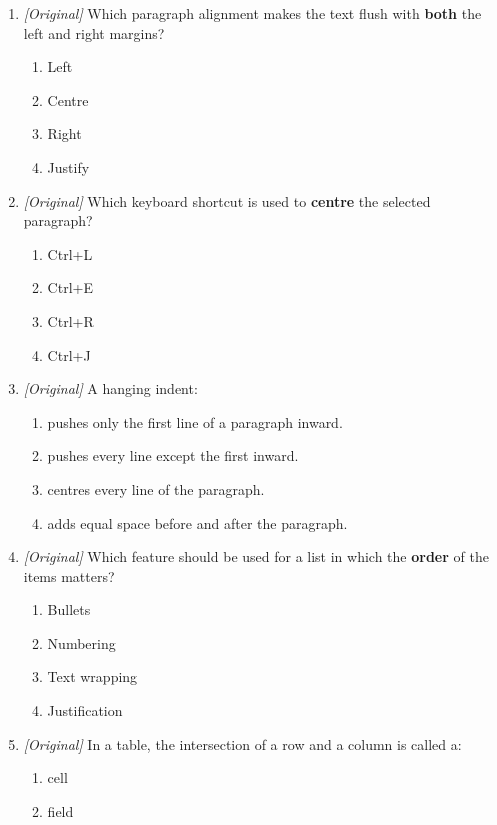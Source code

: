 \documentclass[11pt]{article}
\begin{document}
\begin{enumerate}[label=\textbf{Q\arabic*.}, leftmargin=*]
\begin{enumerate}[label=\Alph*.]
    \item It can be moved below the Ribbon.
  \end{enumerate}
\item \textit{[Original]} Which paragraph alignment makes the text flush with
  \textbf{both} the left and right margins?
  \begin{enumerate}[label=\Alph*.]
    \item Left
    \item Centre
    \item Right
    \item Justify
  \end{enumerate}
\item \textit{[Original]} Which keyboard shortcut is used to \textbf{centre}
  the selected paragraph?
  \begin{enumerate}[label=\Alph*.]
    \item Ctrl+L
    \item Ctrl+E
    \item Ctrl+R
    \item Ctrl+J
  \end{enumerate}
\item \textit{[Original]} A hanging indent:
  \begin{enumerate}[label=\Alph*.]
    \item pushes only the first line of a paragraph inward.
    \item pushes every line except the first inward.
    \item centres every line of the paragraph.
    \item adds equal space before and after the paragraph.
  \end{enumerate}
\item \textit{[Original]} Which feature should be used for a list in which
  the \textbf{order} of the items matters?
  \begin{enumerate}[label=\Alph*.]
    \item Bullets
    \item Numbering
    \item Text wrapping
    \item Justification
  \end{enumerate}
\item \textit{[Original]} In a table, the intersection of a row and a column
  is called a:
  \begin{enumerate}[label=\Alph*.]
    \item cell
    \item field

\end{enumerate}
\end{enumerate}
\end{document}
